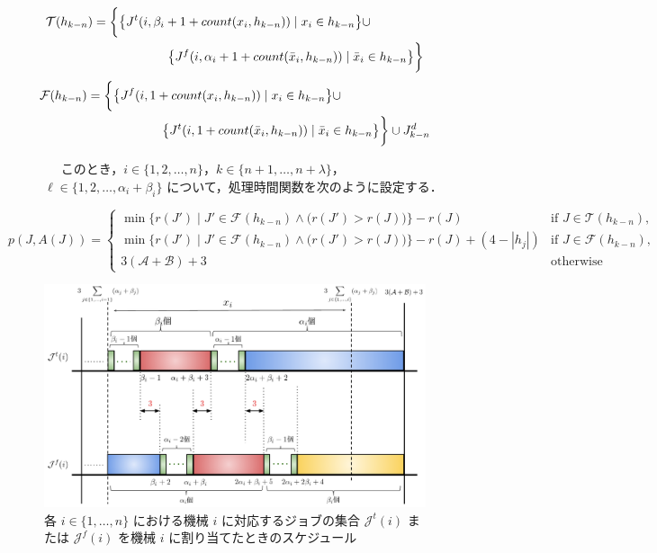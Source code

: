 \documentclass[12pt]{optlab-bachelor}
\begin{document}
\begin{equation}
  \begin{split}
    \mathcal{T}(h_{k - n}) &= \bigg\{\big\{J^t(i,\beta_i + 1 +
    count(x_i,h_{k - n})) \mid x_i \in h_{k - n}\big\} \cup \\ &\qquad \qquad\qquad \big\{J^f(i,\alpha_i + 1 + count(\bar x_i, h_{k - n})) \mid \bar x_i \in h_{k - n}\big\}\bigg\} \notag
  \end{split}
\end{equation}
\begin{equation}
  \begin{split}
    \mathcal{F}(h_{k - n}) &= \bigg\{\big\{J^f(i,1 + count(
    x_i,h_{k - n})) \mid x_i \in h_{k - n} \big\} \cup \\ &\qquad\qquad\qquad \big\{J^t(i,1 + count(\bar x_i,h_{k - n})) \mid \bar x_i \in h_{k - n}\big\} \bigg\} \cup J^d_{k - n} \notag
  \end{split}
\end{equation}
\begin{description}
  \item[] ~~ このとき，$i \in \{1,2,\ldots,n\}$，$k \in \{n + 1, \ldots , n + \lambda\}$，$\ell \in \{1,2,\ldots, \alpha_i + \beta_i\}$ について，処理時間関数を次のように設定する．
\end{description}
{\small
\begin{equation}
  p(J,A(J)) = \left\{ \begin{array}{lll} \min \big\{r(J') \mid
  J' \in \mathcal{F}(h_{k - n}) \wedge \big(r(J') > r(J) \big) \big\} - r(J)
  & \text{if } J \in \mathcal{T}(h_{k - n}), \\ \min \big\{r(J') \mid
  J' \in \mathcal{F}(h_{k - n}) \wedge \big(r(J') > r(J) \big) \big\} - r(J)
  + (4 - |h_j|) & \text{if } J \in \mathcal{F}(h_{k - n}), \\ 3(\mathcal{A} + \mathcal{B}) + 3 & \text{otherwise}\end{array} \right. \tag{B.1}
\end{equation}
}

\begin{figure}[h]
  \centering
  \includegraphics[width = 16cm]{figure/3SAT1.pdf}
  \caption{各 $i \in \{1,\ldots,n\}$ における機械 $i$ に対応するジョブの集合 $\mathcal{J}^t(i)$ または $\mathcal{J}^f(i)$ を機械 $i$ に割り当てたときのスケジュール}
\end{figure}
\end{document}
